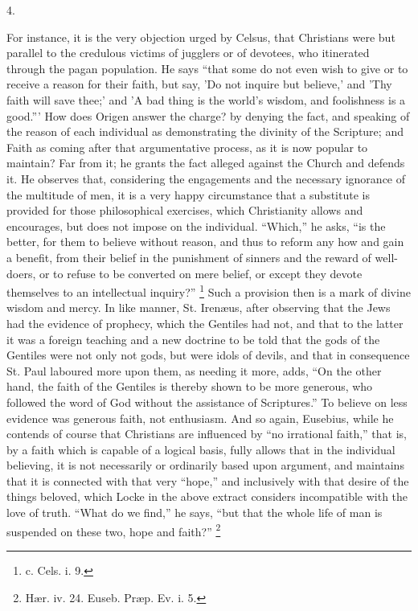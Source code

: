 4.

For instance, it is the very objection urged by Celsus, that
Christians were but parallel to the credulous victims of jugglers or
of devotees, who itinerated through the pagan population. He says
``that some do not even wish to give or to receive a reason for
their faith, but say, 'Do not inquire but believe,' and 'Thy faith
will save thee;' and 'A bad thing is the world's wisdom, and
foolishness is a good.''' How does Origen answer the charge? by
denying the fact, and speaking of the reason of each individual as
demonstrating the divinity of the Scripture; and Faith as coming after
that argumentative process, as it is now popular to maintain? Far from
it; he grants the fact alleged against the Church and defends it. He
observes that, considering the engagements and the necessary ignorance
of the multitude of men, it is a very happy circumstance that a
substitute is provided for those philosophical exercises, which
Christianity allows and encourages, but does not impose on the
individual. ``Which,'' he asks, ``is the better, for them
to believe without reason, and thus to reform any how and gain a
benefit, from their belief in the punishment of sinners and the reward
of well-doers, or to refuse to be converted on mere belief, or except
they devote themselves to an intellectual inquiry?'' \footnote{c. Cels. i. 9.} Such a provision then is a mark of divine wisdom and mercy. In
like manner, St. Irenæus, after observing that the Jews had the
evidence of prophecy, which the Gentiles had not, and that to the
latter it was a foreign teaching and a new doctrine to be told that
the gods of the Gentiles were not only not gods, but were idols of
devils, and that in consequence St. Paul laboured more upon them, as
needing it more, adds, ``On the other hand, the faith of the
Gentiles is thereby shown to be more generous, who followed the word
of God without the assistance of Scriptures.'' To believe on less
evidence was generous faith, not enthusiasm. And so again, Eusebius,
while he contends of course that Christians are influenced by ``no
irrational faith,'' that is, by a faith which is capable of a
logical basis, fully allows that in the individual believing, it is
not necessarily or ordinarily based upon argument, and maintains that
it is connected with that very ``hope,'' and inclusively with
that desire of the things beloved, which Locke in the above extract
considers incompatible with the love of truth. ``What do we
find,'' he says, ``but that the whole life of man is suspended
on these two, hope and faith?'' \footnote{Hær. iv. 24. Euseb. Præp. Ev. i. 5.}

